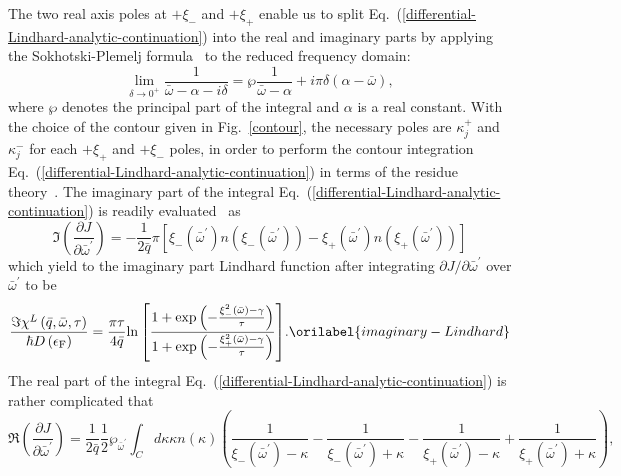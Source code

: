 \documentclass[aps,showkeys,noshowpacs,superscriptaddress,pre,preprint]{revtex4-2}
\let\label\orilabel
\begin{document}
The two real axis poles at $+ \xi_{-}$ and $+ \xi_{+}$ enable us 
to split Eq.~(\ref{differential-Lindhard-analytic-continuation})
into the real and imaginary parts by applying the Sokhotski-Plemelj formula~\cite{Byron-Fuller1992}
to the reduced frequency domain:
\begin{equation*}
\lim_{\delta \rightarrow 0^+} \frac{1}{\bar{\omega} - \alpha - i\delta}
= \wp  \frac{1}{\bar{\omega} - \alpha}  + i \pi {\delta ( \alpha - \bar{\omega} )} ,
\end{equation*}
where $\wp$ denotes the principal part of the integral and $\alpha$ is a real constant.
With the choice of the contour given in Fig.~\ref{contour},
the necessary poles are ${\kappa_j^+}$ and ${\kappa_j^-}$
for each $+ {\xi_+}$ and $+ {\xi_-}$ poles,
in order to perform the contour integration Eq.~(\ref{differential-Lindhard-analytic-continuation})
in terms of the residue theory~\cite{Byron-Fuller1992}.
The imaginary part of the integral Eq.~(\ref{differential-Lindhard-analytic-continuation})
is readily evaluated~\cite{Khanna-Glyde1976} as
\begin{equation*}
\Im \left( \frac{\partial J}{\partial \bar{\omega}^\prime} \right) = 
- \frac{1}{2 \bar{q}} \pi \left[ {\xi_{-} \left( \bar{\omega}^\prime \right)} {n \left( {\xi_{-} \left( \bar{\omega}^\prime \right)} \right) }
- {\xi_{+} \left( \bar{\omega}^\prime \right)} {n \left( {\xi_{+} \left( \bar{\omega}^\prime \right)} \right) } \right] 
\end{equation*}
which yield to the imaginary part Lindhard function 
after integrating $\partial J / \partial \bar{\omega}^\prime$ over $\bar{\omega}^\prime$
to be
\begin{equation}
\frac{\Im \chi^L \left( \bar{q}, \bar{\omega}, \tau \right)}{\hbar D \left( \epsilon_\mathrm{F} \right) } 
= \frac{\pi \tau}{4 \bar{q}} {\ln \left[ \frac{1+ \exp {  \left( - \frac{\xi_{-}^2 \left( \bar{\omega} \right) - \gamma }{\tau} \right)} 
}{
1+ \exp \left( - \frac{\xi_{+}^2 \left( \bar{\omega} \right) - \gamma  }{ \tau}  \right) }
\right] } .
\label{imaginary-Lindhard}
\end{equation}
The real part of the integral Eq.~(\ref{differential-Lindhard-analytic-continuation})
is rather complicated that
\begin{equation*}
\Re \left( \frac{\partial J}{\partial \bar{\omega}^\prime} \right) =  \frac{1}{2 \bar{q}} \frac{1}{2}
\wp_{\bar{\omega}^\prime} \int_C d\kappa \kappa n\left( \kappa \right)
\left(
\frac{1}{\xi_{-} \left( {\bar{\omega}^\prime} \right) - \kappa} - \frac{1}{\xi_{-} \left( {\bar{\omega}^\prime} \right) + \kappa}
- \frac{1}{\xi_{+} \left( {\bar{\omega}^\prime} \right) - \kappa} + \frac{1}{\xi_{+} \left( {\bar{\omega}^\prime} \right) + \kappa}
\right)  ,
\end{equation*}
\end{document}
